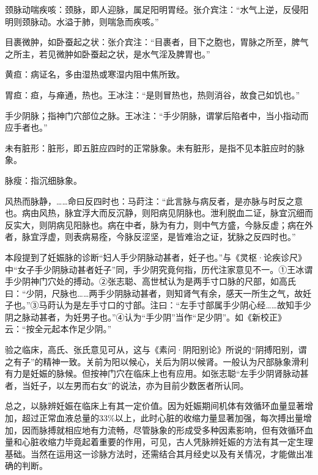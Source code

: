 \documentclass[12pt]{ctexbook}
\begin{document}

\begin{jiaozhu}
  \item 颈脉动喘疾咳：颈脉，即人迎脉，属足阳明胃经。张介宾注：“水气上逆，反侵阳明则颈脉动。水溢于肺，则喘急而疾咳。”
  \item 目裹微肿，如卧蚕起之状：张介宾注：“目裹者，目下之胞也，胃脉之所至，脾气之所主，若见微肿如卧蚕起之状，是水气淫及脾胃也。”
  \item 黄疸：病证名，多由湿热或寒湿内阻中焦所致。
  \item 胃疸：疸，与瘅通，热也。王冰注：“是则冒热也，热则消谷，故食己如饥也。”
  \item 手少阴脉；指神门穴部位之脉。王冰注：“手少阴脉，谓掌后陷者中，当小指动而应手者也。”
  \item 未有脏形：脏形，即五脏应四时的正常脉象。未有脏形，是指不见本脏应时的脉象。
  \item 脉瘦：指沉细脉象。
  \item 风热而脉静，……命曰反四时也：马莳注：“此言脉与病反者，是亦脉与时反之意也。病由风热，脉宜浮大而反沉静，则阳病见阴脉也。泄利脱血二证，脉宜沉细而反实大，则阴病见阳脉也。病在中者，脉为有力，则中气方盛，今脉反虚；病在外者，脉宜浮虚，则表病易痊，今脉反涩坚，是皆难治之证，犹脉之反四时也。”
\end{jiaozhu}



本段提到了妊娠脉的诊断“妇人手少阴脉动甚者，妊子也。”与《灵枢·论疾诊尺》中“女子手少阴脉动甚者妊子”同，手少阴究竟何指，历代注家意见不一。①王冰谓手少阴神门穴处的搏动。②张志聪、高世栻认为是两手寸口脉的尺部，如高氏曰：“少阴，尺脉也……两手少阴脉动甚者，则知肾气有余，感天一所生之气，故妊子也。”③马莳认为是左手寸口的寸部。注曰：“左手寸部属手少阴心经……故知手少阴之脉动甚者，为妊男子也。”④认为“手少阴”当作“足少阴”。如《新校正》云：“按全元起本作足少阴。”

验之临床，高氏、张氏意见可从，这与《素问·阴阳别论》所说的“阴搏阳别，谓之有子”的精神一致。关前为阳以候心，关后为阴以候肾。一般认为尺部脉象滑利有力是妊娠的脉候。但按神门穴在临床上也有应用。如张志聪“左手少阴肾脉动甚者，当妊子，以左男而右女”的说法，亦为目前少数医者所认同。

总之，以脉辨妊娠在临床上有其一定价值。因为妊娠期间机体有效循环血量显著增加，超过正常血液总量的33\%以上，此时心脏的收缩力量显著加强，每次搏出量增加，因而脉搏就相应地有力流畅，尽管脉象的形成受多种因素影响，但有效循环血量和心脏收缩力毕竟起着重要的作用，可见，古人凭脉辨妊娠的方法有其一定生理基础。当然在运用这一诊脉方法时，还需结合其月经史以及有关情况，才能做出准确的判断。
\end{document}
